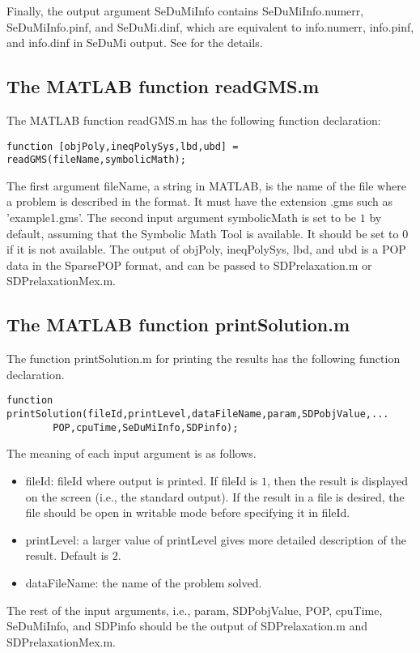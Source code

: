 Finally, the output argument 
{\sf SeDuMiInfo} contains {\sf SeDuMiInfo.numerr}, {\sf SeDuMiInfo.pinf},
and {\sf SeDuMi.dinf}, which
are equivalent to info.numerr, info.pinf, and info.dinf in SeDuMi output.
See \cite{STRUM99} for the details.

\subsection{The MATLAB function readGMS.m} 

The MATLAB function readGMS.m has the following function declaration:
\begin{verbatim}
function [objPoly,ineqPolySys,lbd,ubd] = readGMS(fileName,symbolicMath);
\end{verbatim}
The first argument {\sf fileName}, a string in MATLAB,
is the name of the file where a problem is described
in the \GMS format. It must have the extension .gms such as 'example1.gms'. 
The second input argument {\sf symbolicMath} is set to be $1$ by default, assuming that 
the Symbolic Math Tool is available. It should be set to $0$ if it is not available. 
The output of {\sf objPoly}, {\sf ineqPolySys}, {\sf lbd}, and {\sf ubd} 
is a POP data in  the SparsePOP format, and can be passed to SDPrelaxation.m
or SDPrelaxationMex.m.


\subsection{The MATLAB function printSolution.m} 

The function printSolution.m for printing the results has
the following function declaration.
\begin{verbatim}
function printSolution(fileId,printLevel,dataFileName,param,SDPobjValue,...
        POP,cpuTime,SeDuMiInfo,SDPinfo);
\end{verbatim}
The meaning of each input argument is as follows.
\begin{itemize}
\item {\sf fileId}: fileId where output is printed. If fileId is $1$,
then the result is displayed on the screen (i.e., the standard output).
If the result in a file is desired,
the file should be open in writable mode before specifying it in fileId.
\item {\sf printLevel}: a larger value of printLevel gives more detailed description
of the result. Default is $2$.
\item {\sf dataFileName}: the name of the problem solved.
\end{itemize}
The rest of the input arguments, i.e.,
{\sf param},
{\sf SDPobjValue},
{\sf POP},
{\sf cpuTime},
{\sf SeDuMiInfo}, and 
{\sf SDPinfo} should be the output of 
SDPrelaxation.m and SDPrelaxationMex.m.



